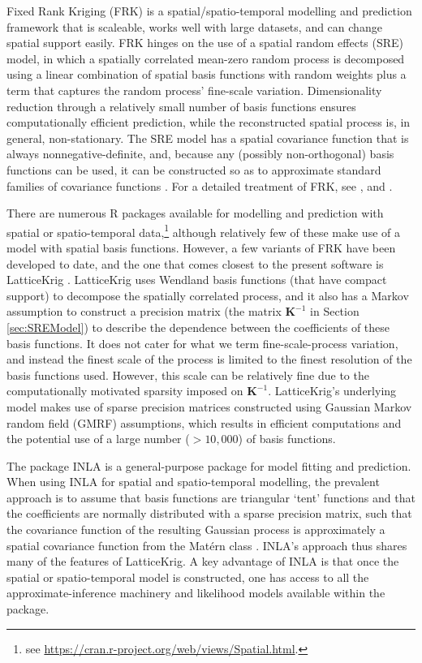 \documentclass{article}\usepackage[]{graphicx}\usepackage[]{color}
\newcommand{\pkg}[1]{{\fontseries{b}\selectfont #1}}
\let\proglang=\textsf
\newcommand{\Kmat} {\textbf{K}}
\begin{document}
Fixed Rank Kriging (FRK) is a spatial/spatio-temporal modelling and prediction framework that is scaleable, works well with large datasets, and can change spatial support easily. FRK hinges on the use of a spatial random effects (SRE) model, in which a spatially correlated mean-zero random process is decomposed using a linear combination of spatial basis functions with random weights plus a term that captures the random process' fine-scale variation. Dimensionality reduction through a relatively small number of basis functions ensures computationally efficient prediction, while the reconstructed spatial process is, in general, non-stationary.  The SRE model has a spatial covariance function that is always nonnegative-definite, and, because any (possibly non-orthogonal) basis functions can be used, it can be constructed so as to approximate standard families of covariance functions \citep{Kang_2011}.  For a detailed treatment of FRK, see \cite{Cressie_2006,Cressie_2008,Shi_2007}, and \cite{Nguyen_2012}.

There are numerous \proglang{R} packages available for modelling and prediction with spatial or spatio-temporal data,\footnote{see \url{https://cran.r-project.org/web/views/Spatial.html}.} although relatively few of these make use of a model with spatial basis functions. However, a few variants of FRK have been developed to date, and the one that comes closest to the present software is \pkg{LatticeKrig} \citep{Nychka_2015}. \pkg{LatticeKrig} uses Wendland basis functions (that have compact support) to decompose the spatially correlated process, and it also has a Markov assumption to construct a precision matrix  (the matrix $\Kmat^{-1}$ in Section \ref{sec:SREModel}) to describe the dependence between the coefficients of these basis functions. It does not cater for what we term fine-scale-process variation, and instead the finest scale of the process is limited to the finest resolution of the basis functions used. However, this scale can be relatively fine due to the computationally motivated sparsity imposed on $\Kmat^{-1}$.  \pkg{LatticeKrig}'s underlying model makes use of sparse precision matrices constructed using Gaussian Markov random field (GMRF) assumptions, which results in efficient computations and the potential use of a large number ($>10,000$) of basis functions.

The package \pkg{INLA} is a general-purpose package for model fitting and prediction. When using \pkg{INLA} for spatial and spatio-temporal modelling, the prevalent approach is to assume that basis functions are triangular `tent' functions and that the coefficients are normally distributed with a sparse precision matrix, such that the covariance function of the resulting Gaussian process is approximately a spatial covariance function from the Mat{\'e}rn class \citep[see][for details on software implementation]{Lindgren_2015}. \pkg{INLA}'s approach thus shares many of the features of \pkg{LatticeKrig}. A key advantage of \pkg{INLA} is that once the spatial or spatio-temporal model is constructed, one has access to all the approximate-inference machinery and likelihood models available within the package.
\end{document}
